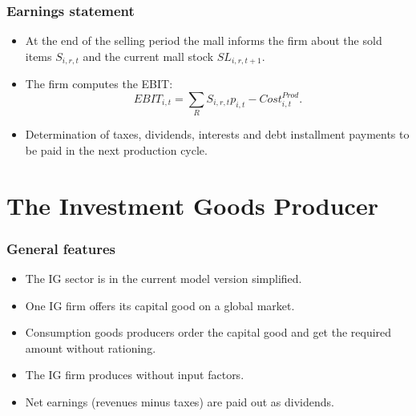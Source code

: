 \documentclass{beamer}
\begin{document}
\frame
{

  \frametitle{Earnings statement} 
\begin{itemize}

\item At the end of the selling period the mall informs the firm about the sold items $S_{i,r,t}$ and the current mall stock $SL_{i,r,t+1}.$

\item The firm computes the EBIT: 
\[
EBIT_{i,t}= \sum_{R}S_{i,r,t}p_{i,t} - Cost^{Prod}_{i,t}.
\]
\item Determination of taxes, dividends, interests and debt installment payments to be paid in the next production cycle.
\end{itemize}
  
}

\section{The Investment Goods Producer}



\frame
{

  \frametitle{General features} 
\begin{itemize}

\item The IG sector is in the current model version simplified.

\item One IG firm offers its capital good on a global market.

\item Consumption goods producers order the capital good and get the required amount without rationing. 

\item The IG firm produces without input factors.

\item Net earnings (revenues minus taxes) are paid out as dividends. 

\end{itemize}
  
}
\end{document}
